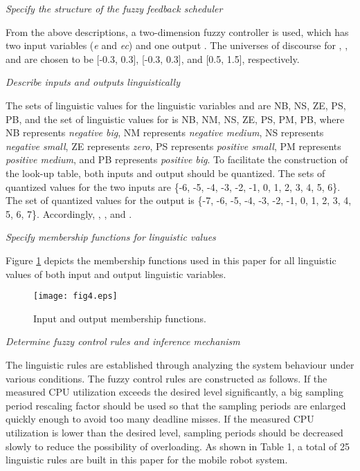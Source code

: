 \documentclass[12pt,a4paper]{ijicic}
\begin{document}
\begin{asparaenum}
\item \emph{Specify the structure of the fuzzy feedback scheduler}

From the above descriptions, a two-dimension fuzzy controller is
used, which has two input variables (\emph{e} and \emph{ec}) and one
output . The universes of discourse for , , and 
are chosen to be [-0.3, 0.3], [-0.3, 0.3], and [0.5, 1.5],
respectively.

\item \emph{Describe inputs and outputs linguistically}

The sets of linguistic values for the linguistic variables  and
 are {NB, NS, ZE, PS, PB}, and the set of linguistic values for
 is {NB, NM, NS, ZE, PS, PM, PB}, where NB represents
\emph{negative big}, NM represents \emph{negative medium}, NS
represents \emph{negative small}, ZE represents \emph{zero}, PS
represents \emph{positive small}, PM represents \emph{positive
medium}, and PB represents \emph{positive big}. To facilitate the
construction of the look-up table, both inputs and output should be
quantized. The sets of quantized values for the two inputs are \{-6,
-5, -4, -3, -2, -1, 0, 1, 2, 3, 4, 5, 6\}. The set of quantized
values for the output is \{-7, -6, -5, -4, -3, -2, -1, 0, 1, 2, 3,
4, 5, 6, 7\}. Accordingly, , ,
and .
\item \emph{Specify membership functions for linguistic values}

Figure \ref{fig4} depicts the membership functions used in this
paper for all linguistic values of both input and output linguistic
variables.
\begin{figure}[htb!]
\begin{center}
\texttt{[image: fig4.eps]}
\caption{Input and output membership functions.}
\label{fig4}
\end{center}
\end{figure}

\item \emph{Determine fuzzy control rules and inference mechanism}

The linguistic rules are established through analyzing the system
behaviour under various conditions. The fuzzy control rules are
constructed as follows. If the measured CPU utilization exceeds the
desired level significantly, a big sampling period rescaling factor
should be used so that the sampling periods are enlarged quickly enough
to avoid too many deadline misses. If the measured CPU utilization
is lower than the desired level, sampling periods should be
decreased slowly to reduce the possibility of overloading. As shown
in Table 1, a total of 25 linguistic rules are built in this paper
for the mobile robot system.


\end{asparaenum}
\end{document}
